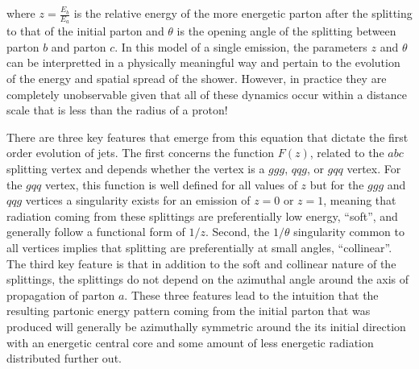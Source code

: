 \documentclass[UKenglish,texlive=2016]{\ATLASLATEXPATH atlasdoc}
\begin{document}
\noindent
where $z=\frac{E_{b}}{E_{a}}$ is the relative energy of the more energetic parton after the splitting to that of the initial parton and $\theta$ is the opening angle of the splitting between parton $b$ and parton $c$.  In this model of a single emission, the parameters $z$ and $\theta$ can be interpretted in a physically meaningful way and pertain to the evolution of the energy and spatial spread of the shower.  However, in practice they are completely unobservable given that all of these dynamics occur within a distance scale that is less than the radius of a proton!

There are three key features that emerge from this equation that dictate the first order evolution of jets.  The first concerns the function $F(z)$, related to the $abc$ splitting vertex and depends whether the vertex is a $ggg$, $qqg$, or $gqq$ vertex.  For the $gqq$ vertex, this function is well defined for all values of $z$ but for the $ggg$ and $qqg$ vertices a singularity exists for an emission of $z=0$ or $z=1$, meaning that radiation coming from these splittings are preferentially low energy, ``soft'', and generally follow a functional form of $1/z$.  Second, the $1/\theta$ singularity common to all vertices implies that splitting are preferentially at small angles, ``collinear''.  The third key feature is that in addition to the soft and collinear nature of the splittings, the splittings do not depend on the azimuthal angle around the axis of propagation of parton $a$.  These three features lead to the intuition that the resulting partonic energy pattern coming from the initial parton that was produced will generally be azimuthally symmetric around the its initial direction with an energetic central core and some amount of less energetic radiation distributed further out.
\end{document}
